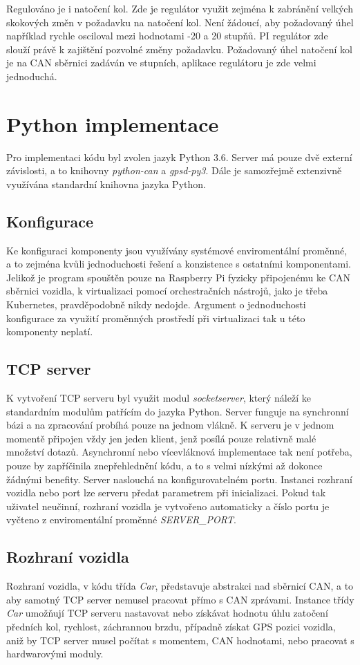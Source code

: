 \documentclass[czech, bachelor]{diploma}
\begin{document}
Regulováno je i natočení kol. Zde je regulátor využit zejména k zabránění velkých skokových změn v požadavku na natočení kol. Není
žádoucí, aby požadovaný úhel například rychle osciloval mezi hodnotami -20 a 20 stupňů. PI regulátor zde slouží právě k zajištění
pozvolné změny požadavku. Požadovaný úhel natočení kol je na CAN sběrnici zadáván ve stupních, aplikace regulátoru je zde velmi
jednoduchá.

\section{Python implementace}

Pro implementaci kódu byl zvolen jazyk Python 3.6. Server má pouze dvě externí závislosti, a to knihovny \emph{python-can} a
\emph{gpsd-py3}. Dále je samozřejmě extenzivně využívána standardní knihovna jazyka Python.

\subsection{Konfigurace}
Ke konfiguraci komponenty jsou využívány systémové enviromentální proměnné, a to zejména kvůli jednoduchosti řešení a konzistence
s ostatními komponentami. Jelikož je program spouštěn pouze na Raspberry Pi fyzicky připojenému ke CAN sběrnici vozidla,
k virtualizaci pomocí orchestračních nástrojů, jako je třeba Kubernetes, pravděpodobně nikdy nedojde. Argument o jednoduchosti
konfigurace za využití proměnných prostředí při virtualizaci tak u této komponenty neplatí.

\subsection{TCP server}
K vytvoření TCP serveru byl využit modul \emph{socketserver}, který náleží ke standardním modulům patřícím do jazyka Python.
Server funguje na synchronní bázi a na zpracování probíhá pouze na jednom vlákně. K serveru je v jednom momentě připojen vždy jen
jeden klient, jenž posílá pouze relativně malé množství dotazů. Asynchronní nebo vícevláknová implementace tak není potřeba,
pouze by zapříčinila znepřehlednění kódu, a to s velmi nízkými až dokonce žádnými benefity. Server naslouchá na konfigurovatelném
portu. Instanci rozhraní vozidla nebo port lze serveru předat parametrem při inicializaci. Pokud tak uživatel neučinní, rozhraní
vozidla je vytvořeno automaticky a číslo portu je vyčteno z enviromentální proměnné \emph{SERVER\_PORT}.

\subsection{Rozhraní vozidla}
Rozhraní vozidla, v kódu třída \emph{Car}, představuje abstrakci nad sběrnicí CAN, a to aby samotný TCP server nemusel pracovat
přímo s CAN zprávami. Instance třídy \emph{Car} umožňují TCP serveru nastavovat nebo získávat hodnotu úhlu zatočení předních kol,
rychlost, záchrannou brzdu, případně získat GPS pozici vozidla, aniž by TCP server musel počítat s momentem, CAN hodnotami, nebo
pracovat s hardwarovými moduly.
\end{document}
